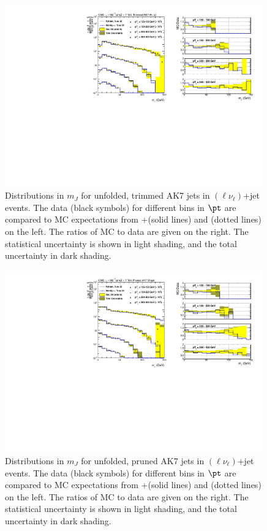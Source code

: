 \begin{figure}[!htb]
\includegraphics[width=0.99\textwidth]{figs/Wln/jetmassunf_ak7tr_log_W.pdf}
\caption{Distributions in $m_J$ for unfolded, trimmed AK7 jets in \PW$(\ell\nu_\ell)$+jet events. The data (black symbols) for different bins in $\pt$ are compared to MC expectations from {\MADGRAPH}+\PYTHIA (solid lines) and \HERWIG (dotted lines) on the left. The ratios of MC to data are given on the right.
The statistical uncertainty is shown in light shading, and the total uncertainty in dark shading.}
\label{figs:AK7WmnInt4}
\end{figure}

\begin{figure}[!htb]
\includegraphics[width=0.99\textwidth]{figs/Wln/jetmassunf_ak7pr_log_W.pdf}
\caption{Distributions in $m_J$ for unfolded, pruned AK7 jets in \PW$(\ell\nu_\ell)$+jet events. The data (black symbols) for different bins in $\pt$ are compared to MC expectations from {\MADGRAPH}+\PYTHIA (solid lines) and \HERWIG (dotted lines) on the left. The ratios of MC to data are given on the right.
The statistical uncertainty is shown in light shading, and the total uncertainty in dark shading.}
\label{figs:AK7WmnInt2}
\end{figure}

